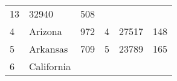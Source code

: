 \documentclass[]{article}
\begin{document}
\begin{longtable}[]{@{}llllll@{}}
\begin{minipage}[t]{0.12\columnwidth}
13\strut
\end{minipage} & \begin{minipage}[t]{0.18\columnwidth}\raggedright
32940\strut
\end{minipage} & \begin{minipage}[t]{0.14\columnwidth}\raggedright
508\strut
\end{minipage}\tabularnewline
\begin{minipage}[t]{0.05\columnwidth}\raggedright
4\strut
\end{minipage} & \begin{minipage}[t]{0.17\columnwidth}\raggedright
Arizona\strut
\end{minipage} & \begin{minipage}[t]{0.16\columnwidth}\raggedright
972\strut
\end{minipage} & \begin{minipage}[t]{0.12\columnwidth}\raggedright
4\strut
\end{minipage} & \begin{minipage}[t]{0.18\columnwidth}\raggedright
27517\strut
\end{minipage} & \begin{minipage}[t]{0.14\columnwidth}\raggedright
148\strut
\end{minipage}\tabularnewline
\begin{minipage}[t]{0.05\columnwidth}\raggedright
5\strut
\end{minipage} & \begin{minipage}[t]{0.17\columnwidth}\raggedright
Arkansas\strut
\end{minipage} & \begin{minipage}[t]{0.16\columnwidth}\raggedright
709\strut
\end{minipage} & \begin{minipage}[t]{0.12\columnwidth}\raggedright
5\strut
\end{minipage} & \begin{minipage}[t]{0.18\columnwidth}\raggedright
23789\strut
\end{minipage} & \begin{minipage}[t]{0.14\columnwidth}\raggedright
165\strut
\end{minipage}\tabularnewline
\begin{minipage}[t]{0.05\columnwidth}\raggedright
6\strut
\end{minipage} & \begin{minipage}[t]{0.17\columnwidth}\raggedright
California\strut
\end{minipage} & \begin{minipage}[t]{0.16\columnwidth}\raggedright

\end{minipage}
\end{longtable}
\end{document}
